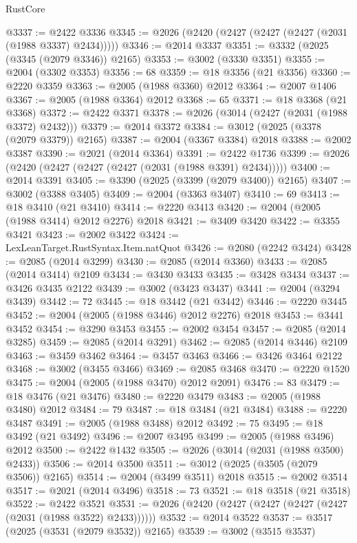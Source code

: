 \begin{lexlean}{RustCore}
\begin{coremodule}
@3337 := @2422 @3336
@3345 := @2026 (@2420 (@2427 (@2427 (@2427 (@2031 (@1988 @3337) @2434)))))
@3346 := @2014 @3337
@3351 := @3332 (@2025 (@3345 (@2079 @3346)) @2165)
@3353 := @3002 (@3330 @3351)
@3355 := @2004 (@3302 @3353)
@3356 := 68
@3359 := @18 @3356 (@21 @3356)
@3360 := @2220 @3359
@3363 := @2005 (@1988 @3360) @2012
@3364 := @2007 @1406
@3367 := @2005 (@1988 @3364) @2012
@3368 := 65
@3371 := @18 @3368 (@21 @3368)
@3372 := @2422 @3371
@3378 := @2026 (@3014 (@2427 (@2031 (@1988 @3372) @2432)))
@3379 := @2014 @3372
@3384 := @3012 (@2025 (@3378 (@2079 @3379)) @2165)
@3387 := @2004 (@3367 @3384) @2018
@3388 := @2002 @3387
@3390 := @2021 (@2014 @3364)
@3391 := @2422 @1736
@3399 := @2026 (@2420 (@2427 (@2427 (@2427 (@2031 (@1988 @3391) @2434)))))
@3400 := @2014 @3391
@3405 := @3390 (@2025 (@3399 (@2079 @3400)) @2165)
@3407 := @3002 (@3388 @3405)
@3409 := @2004 (@3363 @3407)
@3410 := 69
@3413 := @18 @3410 (@21 @3410)
@3414 := @2220 @3413
@3420 := @2004 (@2005 (@1988 @3414) @2012 @2276) @2018
@3421 := @3409 @3420
@3422 := @3355 @3421
@3423 := @2002 @3422
@3424 := LexLeanTarget.RustSyntax.Item.natQuot
@3426 := @2080 (@2242 @3424)
@3428 := @2085 (@2014 @3299)
@3430 := @2085 (@2014 @3360)
@3433 := @2085 (@2014 @3414) @2109
@3434 := @3430 @3433
@3435 := @3428 @3434
@3437 := @3426 @3435 @2122
@3439 := @3002 (@3423 @3437)
@3441 := @2004 (@3294 @3439)
@3442 := 72
@3445 := @18 @3442 (@21 @3442)
@3446 := @2220 @3445
@3452 := @2004 (@2005 (@1988 @3446) @2012 @2276) @2018
@3453 := @3441 @3452
@3454 := @3290 @3453
@3455 := @2002 @3454
@3457 := @2085 (@2014 @3285)
@3459 := @2085 (@2014 @3291)
@3462 := @2085 (@2014 @3446) @2109
@3463 := @3459 @3462
@3464 := @3457 @3463
@3466 := @3426 @3464 @2122
@3468 := @3002 (@3455 @3466)
@3469 := @2085 @3468
@3470 := @2220 @1520
@3475 := @2004 (@2005 (@1988 @3470) @2012 @2091)
@3476 := 83
@3479 := @18 @3476 (@21 @3476)
@3480 := @2220 @3479
@3483 := @2005 (@1988 @3480) @2012
@3484 := 79
@3487 := @18 @3484 (@21 @3484)
@3488 := @2220 @3487
@3491 := @2005 (@1988 @3488) @2012
@3492 := 75
@3495 := @18 @3492 (@21 @3492)
@3496 := @2007 @3495
@3499 := @2005 (@1988 @3496) @2012
@3500 := @2422 @1432
@3505 := @2026 (@3014 (@2031 (@1988 @3500) @2433))
@3506 := @2014 @3500
@3511 := @3012 (@2025 (@3505 (@2079 @3506)) @2165)
@3514 := @2004 (@3499 @3511) @2018
@3515 := @2002 @3514
@3517 := @2021 (@2014 @3496)
@3518 := 73
@3521 := @18 @3518 (@21 @3518)
@3522 := @2422 @3521
@3531 := @2026 (@2420 (@2427 (@2427 (@2427 (@2427 (@2031 (@1988 @3522) @2433))))))
@3532 := @2014 @3522
@3537 := @3517 (@2025 (@3531 (@2079 @3532)) @2165)
@3539 := @3002 (@3515 @3537)

\end{coremodule}
\end{lexlean}
